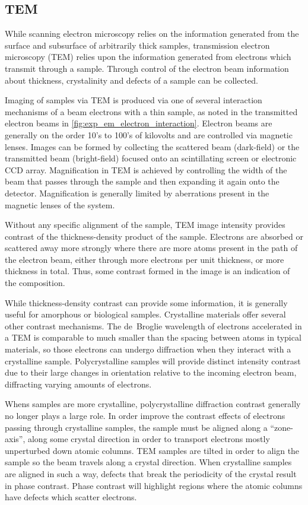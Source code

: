 \subsection{TEM}
While scanning electron microscopy relies on the information generated from the surface and subsurface of arbitrarily thick samples, transmission electron microscopy (TEM) relies upon the information generated from electrons which transmit through a sample. Through control of the electron beam information about thickness, crystalinity and defects of a sample can be collected.

Imaging of samples via TEM is produced via one of several interaction mechanisms of a beam electrons with a thin sample, as noted in the transmitted electron beams in \cref{fig:exp_em_electron_interaction}. Electron beams are generally on the order 10's to 100's of kilovolts and are controlled via magnetic lenses\cite{Egerton2005}. Images can be formed by collecting the scattered beam (dark-field) or the transmitted beam (bright-field) focused onto an scintillating screen or electronic CCD array. Magnification in TEM is achieved by controlling the width of the beam that passes through the sample and then expanding it again onto the detector. Magnification is generally limited by aberrations present in the magnetic lenses of the system.

Without any specific alignment of the sample, TEM image intensity provides contrast of the thickness-density product of the sample\cite{Egerton2005}. Electrons are absorbed or scattered away more strongly where there are more atoms present in the path of the electron beam, either through more electrons per unit thickness, or more thickness in total. Thus, some contrast formed in the image is an indication of the composition.

While thickness-density contrast can provide some information, it is generally useful for amorphous or biological samples. Crystalline materials offer several other contrast mechanisms. The de~Broglie wavelength of electrons accelerated in a TEM is comparable to much smaller than the spacing between atoms in typical materials, so those electrons can undergo diffraction when they interact with a crystalline sample. Polycrystalline samples will provide distinct intensity contrast due to their large changes in orientation relative to the incoming electron beam, diffracting varying amounts of electrons\cite{Egerton2005}.

Whens samples are more crystalline, polycrystalline diffraction contrast generally no longer plays a large role. In order improve the contrast effects of electrons passing through crystalline samples, the sample must be aligned along a ``zone-axis'', along some crystal direction in order to transport electrons mostly unperturbed down atomic columns. TEM samples are tilted in order to align the sample so the beam travels along a crystal direction. When crystalline samples are aligned in such a way, defects that break the periodicity of the crystal result in phase contrast. Phase contrast will highlight regions where the atomic columns have defects which scatter electrons\cite{Egerton2005}.

